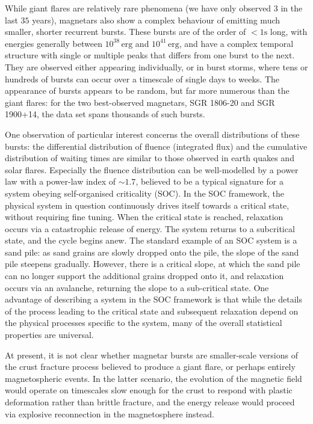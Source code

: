 \documentclass[12pt]{emulateapj}
\begin{document}
While giant flares are relatively rare phenomena (we have only observed $3$ in the last $35$ years), magnetars also show a complex
behaviour of emitting much smaller, shorter recurrent bursts. These bursts are of the order of $<1\mathrm{s}$ long, with energies
generally between $10^{38}\,\mathrm{erg}$ and $10^{41}\,\mathrm{erg}$, and have a complex temporal structure with single or
multiple peaks that differs from one burst to the next. They are observed either appearing individually, or in burst 
storms, where tens or hundreds of bursts can occur over a timescale of single days to weeks. The appearance of bursts appears to be
random, but far more numerous than the giant flares: for the two best-observed magnetars, SGR 1806-20 and SGR 1900+14, the
data set spans thousands of such bursts. 

One observation of particular interest concerns the overall distributions of these bursts: the differential distribution of fluence (integrated flux) and 
the cumulative distribution of waiting times are similar to those observed in earth quakes and solar flares. Especially the fluence distribution
can be well-modelled by a power law with a power-law index of $\sim 1.7$, believed to be a typical signature for a system obeying 
self-organised criticality (SOC). In the SOC framework, the physical system in question continuously drives itself towards a critical state,
without requiring fine tuning. When the critical state is reached, relaxation occurs via a catastrophic release of energy. The system returns
to a subcritical state, and the cycle begins anew. The standard example of an SOC system is a sand pile: as sand grains are slowly dropped onto
the pile, the slope of the sand pile steepens gradually. However, there is a critical slope, at which the sand pile can no longer support the 
additional grains dropped onto it, and relaxation occurs via an avalanche, returning the slope to a sub-critical state. 
One advantage of describing a system in the SOC framework is that while the details of the process leading to the critical state and subsequent
relaxation depend on the physical processes specific to the system, many of the overall statistical properties are universal.

At present, it is not clear whether magnetar bursts are smaller-scale versions of the crust fracture process believed to produce a giant flare,
or perhaps entirely magnetospheric events. In the latter scenario, the evolution of the magnetic field would operate on timescales
slow enough for the crust to respond with plastic deformation rather than brittle fracture, and the energy release would proceed via
explosive reconnection in the magnetosphere instead.
\end{document}
